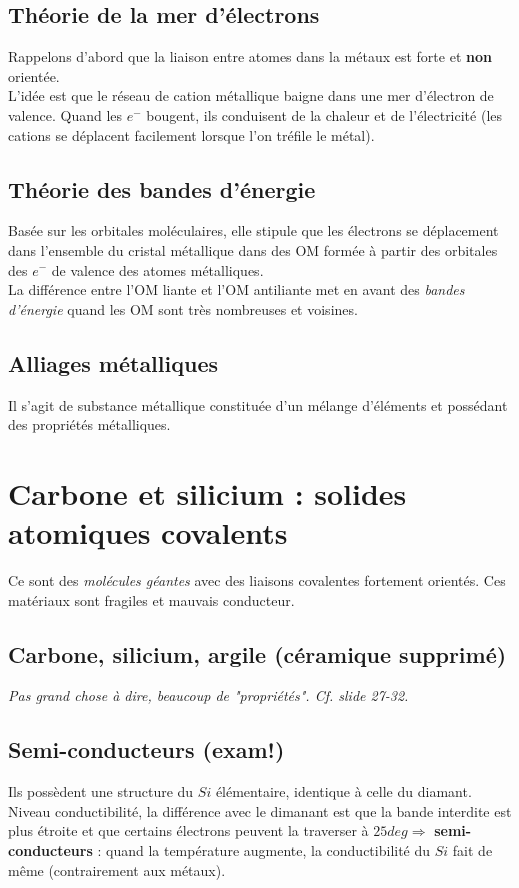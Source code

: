 \documentclass	[11pt, a4paper, openany]{book}
\begin{document}
	\subsection*{Théorie de la mer d'électrons}
	Rappelons d'abord que la liaison entre atomes dans la métaux est forte et \textbf{non} orientée.\\
	
	L'idée est que le réseau de cation métallique baigne dans une mer d'électron de valence. Quand les $e^-$ bougent, ils conduisent de la chaleur et de l'électricité (les cations se déplacent facilement lorsque l'on tréfile le métal).
	
	\subsection*{Théorie des bandes d'énergie}
	Basée sur les orbitales moléculaires, elle stipule que les électrons se déplacement dans l'ensemble du cristal métallique dans des OM formée à partir des orbitales des $e^-$ de valence des atomes métalliques.\\
	La différence entre l'OM liante et l'OM antiliante met en avant des \textit{bandes d'énergie} quand les OM sont très nombreuses et voisines.
	
	\subsection*{Alliages métalliques}
	Il s'agit de substance métallique constituée d'un mélange d'éléments et possédant des propriétés métalliques.
	
	
	\section{Carbone et silicium : solides atomiques covalents}
	Ce sont des \textit{molécules géantes} avec des liaisons covalentes fortement orientés. Ces matériaux sont fragiles et mauvais conducteur.
	
	\subsection*{Carbone, silicium, argile (céramique supprimé)}
	\textit{Pas grand chose à dire, beaucoup de "propriétés". Cf. slide 27-32.}
	
	\subsection*{Semi-conducteurs (exam!)}
	Ils possèdent une structure du $Si$ élémentaire, identique à celle du diamant. Niveau conductibilité, la différence avec le dimanant est que la bande interdite est plus étroite et que certains électrons peuvent la traverser à $25deg \Rightarrow$ \textbf{semi-conducteurs} : quand la température augmente, la conductibilité du $Si$ fait de même (contrairement aux métaux).\\
	
\end{document}
